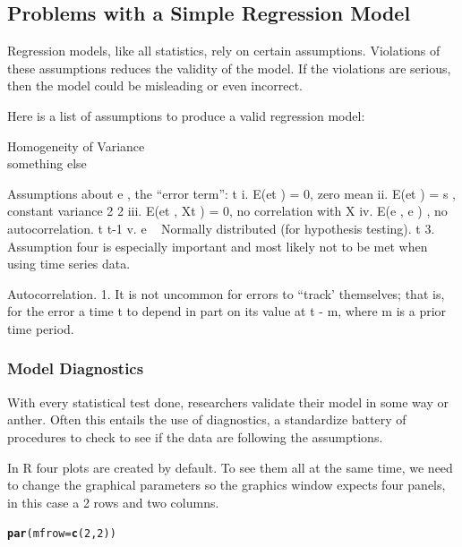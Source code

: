 \documentclass{article}\usepackage[]{graphicx}\usepackage[]{color}
\makeatletter
\newcommand{\hlnum}[1]{\textcolor[rgb]{0.686,0.059,0.569}{#1}}%
\newcommand{\hlstd}[1]{\textcolor[rgb]{0.345,0.345,0.345}{#1}}%
\newcommand{\hlkwc}[1]{\textcolor[rgb]{0.333,0.667,0.333}{#1}}%
\newcommand{\hlkwd}[1]{\textcolor[rgb]{0.737,0.353,0.396}{\textbf{#1}}}%
\newenvironment{kframe}{%
 \def\at@end@of@kframe{}%
 \ifinner\ifhmode%
  \def\at@end@of@kframe{\end{minipage}}%
  \begin{minipage}{\columnwidth}%
 \fi\fi%
 \def\FrameCommand##1{\hskip\@totalleftmargin \hskip-\fboxsep
 \colorbox{shadecolor}{##1}\hskip-\fboxsep
     \hskip-\linewidth \hskip-\@totalleftmargin \hskip\columnwidth}%
 \MakeFramed {\advance\hsize-\width
   \@totalleftmargin\z@ \linewidth\hsize
   \@setminipage}}%
 {\par\unskip\endMakeFramed%
 \at@end@of@kframe}
\newenvironment{knitrout}{}{} %
\makeatother
\begin{document}
\subsection{Problems with a Simple Regression Model}

Regression models, like all statistics, rely on certain assumptions. Violations of these assumptions reduces the validity of the model. If the violations are serious, then the model could be misleading or even incorrect.

Here is a list of assumptions to produce a valid regression model:

\begin{description}
  \item[Homogeneity of Variance]
  \item[something else]
\end{description}

Assumptions about e , the “error term”: t
i. E(et
) = 0, zero mean
ii. E(et
) = s , constant variance 2 2
iii. E(et
, Xt
) = 0, no correlation with X
iv. E(e , e ) , no autocorrelation. t t-1
v. e ~ Normally distributed (for hypothesis testing). t
3. Assumption four is especially important and most likely not to be met when
using time series data.

Autocorrelation.
1. It is not uncommon for errors to “track’ themselves; that is, for the error a
time t to depend in part on its value at t - m, where m is a prior time
period.
\subsubsection{Model Diagnostics}

With every statistical test done, researchers validate their model in some way or anther. Often this entails the use of diagnostics, a standardize battery of procedures to check to see if the data are following the assumptions. 

In R four plots are created by default.  To see them all at the same time, we need to change the graphical parameters so the graphics window expects four panels, in this case a 2 rows and two columns. 

\begin{knitrout}
\color{fgcolor}\begin{kframe}
\begin{alltt}
\hlkwd{par}\hlstd{(}\hlkwc{mfrow}\hlstd{=}\hlkwd{c}\hlstd{(}\hlnum{2}\hlstd{,}\hlnum{2}\hlstd{))}
\end{alltt}
\end{kframe}
\end{knitrout}
\end{document}

